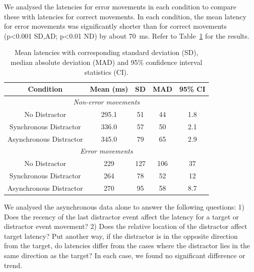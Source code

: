 \documentclass[10pt,letterpaper]{article}
\begin{document}
We analysed the latencies for error movements in each condition to
compare these with latencies for correct movements. In each condition,
the mean latency for error movements was significantly shorter than
for correct movements (p\textless0.001 SD,AD; p\textless0.01 ND) by
about 70~ms. Refer to Table~\ref{table:latencies} for the results.

\begin{table}[ht]
\caption{Mean latencies with corresponding standard deviation (SD),
  median absolute deviation (MAD) and 95\% confidence interval
  statistics (CI).}  \centering
\begin{tabular}{c c c c c}
\hline
\textbf{Condition} & \textbf{Mean (ms)} & \textbf{SD} & \textbf{MAD} & \textbf{95\% CI} \\ [0.5ex]
\hline
\multicolumn{5}{c}{\emph{Non-error movements}} \\
\hline
No Distractor           & 295.1 & 51 & 44 & 1.8 \\
Synchronous Distractor  & 336.0 & 57 & 50 & 2.1 \\
Asynchronous Distractor & 345.0 & 79 & 65 & 2.9 \\ [1ex]
\hline
\multicolumn{5}{c}{\emph{Error movements}} \\
\hline
No Distractor           & 229 & 127 & 106 & 37  \\
Synchronous Distractor  & 264 &  78 &  52 & 12  \\
Asynchronous Distractor & 270 &  95 &  58 & 8.7 \\ [1ex]
\hline
\end{tabular}
\label{table:latencies}
\end{table}


We analysed the asynchronous data alone to answer the following
questions: 1) Does the recency of the last distractor event affect the
latency for a target or distractor event movement?  2) Does the
relative location of the distractor affect target latency? Put another
way, if the distractor is in the opposite direction from the target,
do latencies differ from the cases where the distractor lies in the
same direction as the target? In each case, we found no significant
difference or trend. %
\end{document}
